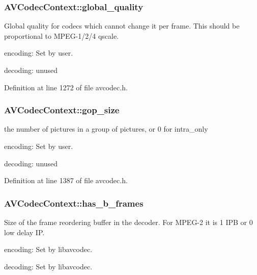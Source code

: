\subsubsection[{\texorpdfstring{global\+\_\+quality}{global_quality}}]{ A\+V\+Codec\+Context\+::global\+\_\+quality}\hypertarget{struct_a_v_codec_context_a209f5ec60cb5f0b0a4962f4c5c5bb541}{}\label{struct_a_v_codec_context_a209f5ec60cb5f0b0a4962f4c5c5bb541}
Global quality for codecs which cannot change it per frame. This should be proportional to M\+P\+E\+G-\/1/2/4 qscale.
\begin{DoxyItemize}
\item encoding\+: Set by user.
\item decoding\+: unused 
\end{DoxyItemize}

Definition at line 1272 of file avcodec.\+h.

\subsubsection[{\texorpdfstring{gop\+\_\+size}{gop_size}}]{ A\+V\+Codec\+Context\+::gop\+\_\+size}\hypertarget{struct_a_v_codec_context_a9b6b3f1fcbdcc2ad9f4dbb4370496e38}{}\label{struct_a_v_codec_context_a9b6b3f1fcbdcc2ad9f4dbb4370496e38}
the number of pictures in a group of pictures, or 0 for intra\+\_\+only
\begin{DoxyItemize}
\item encoding\+: Set by user.
\item decoding\+: unused 
\end{DoxyItemize}

Definition at line 1387 of file avcodec.\+h.

\subsubsection[{\texorpdfstring{has\+\_\+b\+\_\+frames}{has_b_frames}}]{ A\+V\+Codec\+Context\+::has\+\_\+b\+\_\+frames}\hypertarget{struct_a_v_codec_context_a686a77363668795c15c87b532cc455fa}{}\label{struct_a_v_codec_context_a686a77363668795c15c87b532cc455fa}
Size of the frame reordering buffer in the decoder. For M\+P\+E\+G-\/2 it is 1 I\+PB or 0 low delay IP.
\begin{DoxyItemize}
\item encoding\+: Set by libavcodec.
\item decoding\+: Set by libavcodec. 
\end{DoxyItemize}

